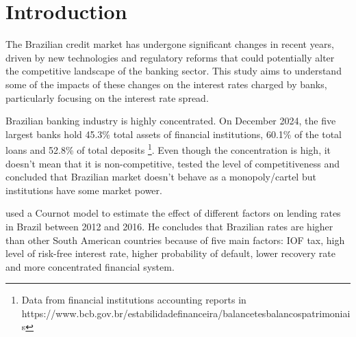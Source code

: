 \chapter{Introduction}
The Brazilian credit market has undergone significant changes in recent years, driven by new technologies and regulatory reforms that could potentially alter the competitive landscape of the banking sector. This study aims to understand some of the impacts of these changes on the interest rates charged by banks, particularly focusing on the interest rate spread. 

Brazilian banking industry is highly concentrated. On December 2024, the five largest banks hold 45.3\% total assets of financial institutions, 60.1\% of the total loans and 52.8\% of total deposits \footnote{Data from financial institutions accounting reports in \\ https://www.bcb.gov.br/estabilidadefinanceira/balancetesbalancospatrimoniais}. Even though the concentration is high, it doesn't mean that it is non-competitive,  tested the level of competitiveness and concluded that Brazilian market doesn't behave as a monopoly/cartel but institutions have some market power.

 used a Cournot model to estimate the effect of different factors on lending rates in Brazil between 2012 and 2016. He concludes that Brazilian rates are higher than other South American countries because of five main factors: IOF tax, high level of risk-free interest rate, higher probability of default, lower recovery rate and more concentrated financial system.
